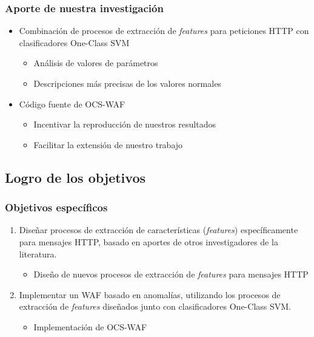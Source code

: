 \begin{frame}
    \frametitle{Aporte de nuestra investigación}

    \begin{itemize}
        \item
        Combinación de procesos de extracción de \textit{features} para
        peticiones HTTP con clasificadores One-Class SVM

        \begin{itemize}[<.->]
            \item
            Análisis de valores de parámetros

            \item
            Descripciones más precisas de los valores normales
        \end{itemize}

        \item<2->
        Código fuente de OCS-WAF

        \begin{itemize}[<.->]
            \item
            Incentivar la reproducción de nuestros resultados

            \item
            Facilitar la extensión de nuestro trabajo
        \end{itemize}
    \end{itemize}
\end{frame}



\subsection{Logro de los objetivos}

\begin{frame}
    \frametitle{Objetivos específicos}

    \begin{enumerate}[<+(1)->]
        \item
        Diseñar procesos de extracción de características (\textit{features})
        específicamente para mensajes HTTP, basado en aportes de otros
        investigadores de la literatura.

        \begin{itemize}[<.->]
            \item
            Diseño de nuevos procesos de extracción de \textit{features}
            para mensajes HTTP
        \end{itemize}

        \item
        Implementar un WAF basado en anomalías, utilizando los procesos de
        extracción de \textit{features} diseñados junto con clasificadores
        One-Class SVM.

        \begin{itemize}[<.->]
            \item
            Implementación de OCS-WAF
        \end{itemize}

        \savemynewenumi
    \end{enumerate}
\end{frame}

